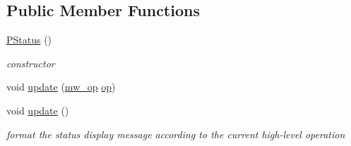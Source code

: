 \subsection*{Public Member Functions}
\begin{CompactItemize}
\item 
\hypertarget{classPStatus_fd35bafbb383a846915c2f366a6cd08b}{
\hyperlink{classPStatus_fd35bafbb383a846915c2f366a6cd08b}{PStatus} ()}
\label{classPStatus_fd35bafbb383a846915c2f366a6cd08b}

\begin{CompactList}\small\item\em constructor \item\end{CompactList}\item 
void \hyperlink{classPStatus_633fc560875724006dbe656a7e4665e5}{update} (\hyperlink{classPStatus_12bddf7bbeab6dfb53ae018c4f2939fd}{mw\_\-op} \hyperlink{classPStatus_140a3641f74f0eaf753ad357695407d6}{op})
\item 
\hypertarget{classPStatus_2cbc1ea1c01a19ca70e53777ffafa50c}{
void \hyperlink{classPStatus_2cbc1ea1c01a19ca70e53777ffafa50c}{update} ()}
\label{classPStatus_2cbc1ea1c01a19ca70e53777ffafa50c}

\begin{CompactList}\small\item\em format the status display message according to the current high-level operation \item\end{CompactList}\end{CompactItemize}
